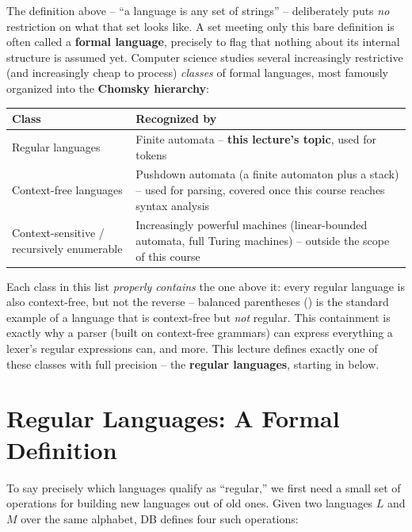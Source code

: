\documentclass[full-course-notes.tex]{subfiles}
\begin{document}
\begin{coreidea}
The definition above -- ``a language is any set of strings'' -- deliberately puts \emph{no}
restriction on what that set looks like. A set meeting only this bare definition is often
called a \textbf{formal language}, precisely to flag that nothing about its internal structure
is assumed yet. Computer science studies several increasingly restrictive (and increasingly
cheap to process) \emph{classes} of formal languages, most famously organized into the
\textbf{Chomsky hierarchy}:
\begin{center}
\small
\renewcommand{\arraystretch}{1.3}
\begin{tabularx}{\textwidth}{@{}l X@{}}
\toprule
\textbf{Class} & \textbf{Recognized by} \\
\midrule
Regular languages & Finite automata -- \textbf{this lecture's topic}, used for tokens \\
Context-free languages & Pushdown automata (a finite automaton plus a stack) -- used for
parsing, covered once this course reaches syntax analysis \\
Context-sensitive / recursively enumerable & Increasingly powerful machines (linear-bounded
automata, full Turing machines) -- outside the scope of this course \\
\bottomrule
\end{tabularx}
\end{center}
Each class in this list \emph{properly contains} the one above it: every regular language is
also context-free, but not the reverse -- balanced parentheses
() is the standard example of a language that is context-free
but \emph{not} regular. This containment is exactly why a parser (built on context-free
grammars) can express everything a lexer's regular expressions can, and more. This lecture
defines exactly one of these classes with full precision -- the \textbf{regular languages},
starting in  below.
\end{coreidea}

\section{Regular Languages: A Formal Definition}
\label{sec:l3-regular-languages-formal}

\dbtag To say precisely which languages qualify as ``regular,'' we first need a small set of
operations for building new languages out of old ones. Given two languages $L$ and $M$ over the
same alphabet, DB defines four such operations:
\end{document}
